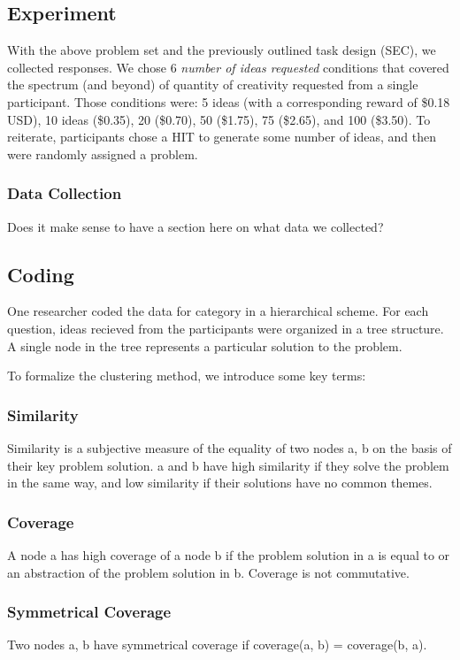 \subsection{Experiment}

With the above problem set and the previously outlined task design (SEC), we collected responses. We chose 6 \emph{number of ideas requested} conditions that covered the spectrum (and beyond) of quantity of creativity requested from a single participant. Those conditions were: 5 ideas (with a corresponding reward of \$0.18 USD), 10 ideas (\$0.35), 20 (\$0.70), 50 (\$1.75), 75 (\$2.65), and 100 (\$3.50). To reiterate, participants chose a HIT to generate some number of ideas, and then were randomly assigned a problem.

\subsubsection{Data Collection}

Does it make sense to have a section here on what data we collected?

\subsection{Coding}

One researcher coded the data for category in a hierarchical scheme. For each question, ideas recieved from the participants were organized in a tree structure. A single node in the tree represents a particular solution to the problem.

To formalize the clustering method, we introduce some key terms:

\subsubsection{Similarity}
Similarity is a subjective measure of the equality of two nodes a, b on the basis of their key problem solution. a and b have high similarity if they solve the problem in the same way, and low similarity if their solutions have no common themes.

\subsubsection{Coverage}
A node a has high coverage of a node b if the problem solution in a is equal to or an abstraction of the problem solution in b. Coverage is not commutative.

\subsubsection{Symmetrical Coverage}
Two nodes a, b have symmetrical coverage if coverage(a, b) = coverage(b, a).

